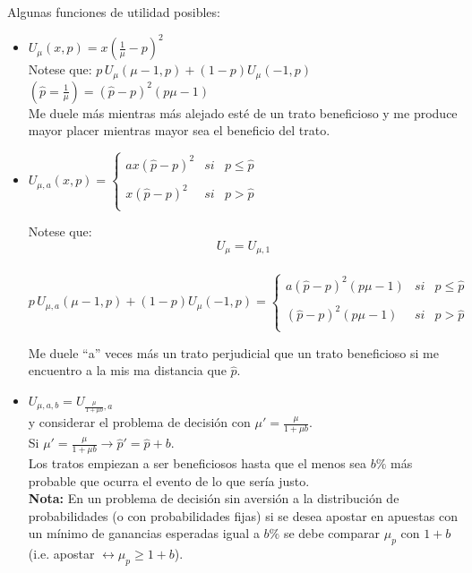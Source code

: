 Algunas funciones de utilidad posibles:
\begin{itemize}
 \item $U_\mu(x,p)=x(\frac{1}{\mu}-p)^2$\\
 
 Notese que: $p\,U_\mu(\mu-1,p)+(1-p)U_\mu(-1,p)$\\
 
 $(\hat p=\frac{1}{\mu})=(\hat p-p)^2(p\mu-1)$\\
 
 Me duele más mientras más alejado esté de un trato beneficioso y me produce mayor placer mientras mayor sea el beneficio del trato.
 
 \item $U_{\mu,a}(x,p)= \left\{ \begin{array}{lcc}
             ax(\hat p-p)^2 &   si  & p \le \hat p \\
             & &\\
             x (\hat p-p)^2 &  si & p>\hat p\\             
             \end{array}
 \right.$
 
 Notese que: \\
 \[U_\mu=U_{\mu,1}\]\\
 \[p\,U_{\mu,a}(\mu-1,p)+(1-p)U_\mu(-1,p)= \left\{ \begin{array}{lcc}
             a(\hat p-p)^2 (p\mu-1)&   si  & p \le \hat p \\
             & &\\
             (\hat p-p)^2(p\mu-1) &  si & p>\hat p\\             
             \end{array}
 \right.\]

 Me duele ``a'' veces más un trato perjudicial  que un trato beneficioso si me encuentro a la mis ma distancia que $\hat p$.
 
 \item $U_{\mu,a,b}=U_{\frac{\mu}{1+\mu b},a}$\\
 
 y considerar el problema de decisión con $\mu'=\frac{\mu}{1+\mu b}$.\\
 
 Si $\mu'=\frac{\mu}{1+\mu b}\rightarrow \hat p'=\hat p+b$.\\
 
 Los tratos empiezan a ser beneficiosos hasta que el menos sea $b\%$ más probable que ocurra el evento de lo que sería justo.\\
 
 {\bf Nota:} En un problema de decisión sin aversión a la distribución de probabilidades (o con probabilidades fijas) si se desea apostar en apuestas con un mínimo de ganancias esperadas igual a $b\%$ se debe comparar $\mu_p$ con $1+b$ (i.e. apostar $\leftrightarrow \mu_p \ge 1+b$).
 
\end{itemize}

